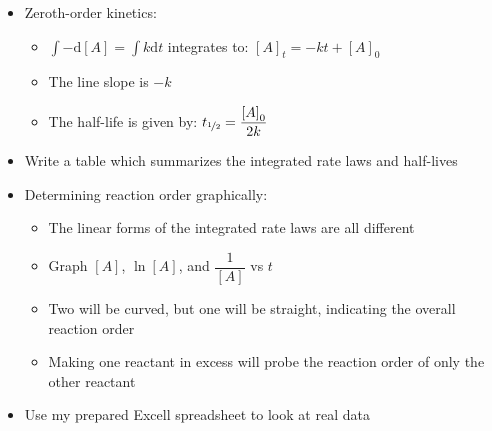 \documentclass[12pt, openany, letterpaper]{memoir}
\begin{document}
\begin{itemize}
\begin{itemize}
	\end{itemize}
	\item Zeroth-order kinetics:
	\begin{itemize}
		\item $\int-\mathrm{d} \left[A\right] = \int k\mathrm{d} t$ integrates to: $[A]_t = -kt + [A]_0$
		\item The line slope is $-k$
		\item The half-life is given by: $t_{\nicefrac{1}{2}}=\dfrac{\left[A\right]_0}{2k}$ 
	\end{itemize}
	\item Write a table which summarizes the integrated rate laws and half-lives
	\item Determining reaction order graphically:
	\begin{itemize}
		\item The linear forms of the integrated rate laws are all different
		\item Graph $\left[A\right]$, $\ln \left[A\right]$, and $\dfrac{1}{\left[A\right]}$ vs $t$
		\item Two will be curved, but one will be straight, indicating the overall reaction order
		\item Making one reactant in excess will probe the reaction order of only the other reactant
	\end{itemize}
	\item Use my prepared Excell spreadsheet to look at real data
\end{itemize}
\end{document}
